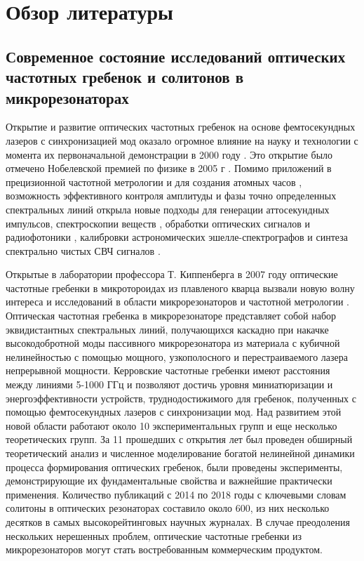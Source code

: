 \chapter{Обзор литературы} \label{chapt1}

\section{Современное состояние исследований оптических частотных гребенок и солитонов в микрорезонаторах} \label{sect1_1}

Открытие и развитие оптических частотных гребенок на основе фемтосекундных лазеров с синхронизацией мод оказало огромное влияние на науку и технологии с момента их первоначальной демонстрации в 2000 году \cite{Jones635,PhysRevLett.84.5102}. Это открытие было отмечено Нобелевской премией по физике в 2005 г \cite{Hall2006}. Помимо приложений в прецизионной частотной метрологии и для создания атомных часов \cite{Diddams2001,Udem2002,Ye2005,Diddams2004}, возможность эффективного контроля амплитуды и фазы точно определенных спектральных линий открыла новые подходы для генерации аттосекундных импульсов, спектроскопии веществ \cite{Stowe2008,Diddams2007,Ideguchi2013,Holzwarth2000}, обработки оптических сигналов и радиофотоники \cite{Gao2006,Torres2014}, калибровки астрономических эшелле-спектрографов \cite{Steinmetz2008} и синтеза спектрально чистых СВЧ сигналов \cite{Fortier2011}.

Открытые в лаборатории профессора Т. Киппенберга в 2007 году оптические частотные гребенки в микротороидах из плавленого кварца \cite{DelHaye2007} вызвали новую волну интереса и исследований в области микрорезонаторов и частотной метрологии \cite{Kippenberg2011}. Оптическая частотная гребенка в микрорезонаторе представляет собой набор эквидистантных спектральных линий, получающихся каскадно при накачке высокодобротной моды пассивного микрорезонатора из материала с кубичной нелинейностью с помощью мощного, узкополосного и перестраиваемого лазера непрерывной мощности. Керровские частотные гребенки имеют расстояния между линиями 5-1000 ГГц и позволяют достичь уровня миниатюризации и энергоэффективности устройств, труднодостижимого для гребенок, полученных с помощью фемтосекундных лазеров с синхронизации мод. Над развитием этой новой области работают около 10 экспериментальных групп и еще несколько теоретических групп. За 11 прошедших с открытия лет был проведен обширный теоретический анализ и численное моделирование богатой нелинейной динамики процесса формирования оптических гребенок, были проведены эксперименты, демонстрирующие их фундаментальные свойства и важнейшие практически применения. Количество публикаций с 2014 по 2018 годы с ключевыми словам солитоны в оптических резонаторах составило около 600, из них несколько десятков в самых высокорейтинговых научных журналах. В случае преодоления нескольких нерешенных проблем, оптические частотные гребенки из микрорезонаторов могут стать востребованным коммерческим продуктом.

